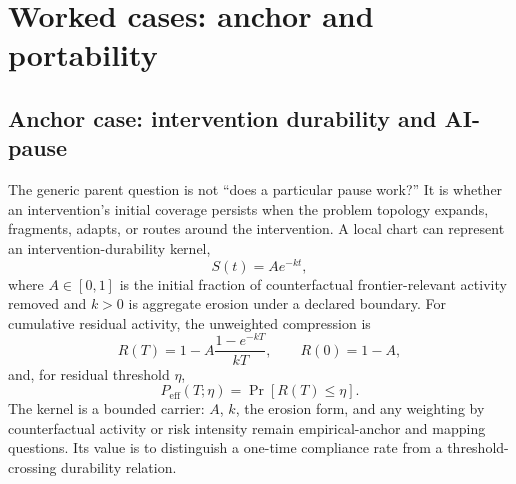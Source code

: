 \documentclass[11pt]{article}
\begin{document}
\section{Worked cases: anchor and portability}
\label{sec:cases}

\subsection{Anchor case: intervention durability and AI-pause}

The generic parent question is not ``does a particular pause work?'' It is whether an intervention's initial coverage persists when the problem topology expands, fragments, adapts, or routes around the intervention. A local chart can represent an intervention-durability kernel,
\begin{equation}
S(t)=Ae^{-kt},
\label{eq:pause-suppression}
\end{equation}
where $A\in[0,1]$ is the initial fraction of counterfactual frontier-relevant activity removed and $k>0$ is aggregate erosion under a declared boundary. For cumulative residual activity, the unweighted compression is
\begin{equation}
R(T)=1-A\frac{1-e^{-kT}}{kT},\qquad R(0)=1-A,
\label{eq:pause-residual}
\end{equation}
and, for residual threshold $\eta$,
\begin{equation}
P_{\mathrm{eff}}(T;\eta)=\Pr[R(T)\leq\eta].
\label{eq:pause-effectiveness}
\end{equation}
The kernel is a bounded carrier: $A$, $k$, the erosion form, and any weighting by counterfactual activity or risk intensity remain empirical-anchor and mapping questions. Its value is to distinguish a one-time compliance rate from a threshold-crossing durability relation.
\end{document}
